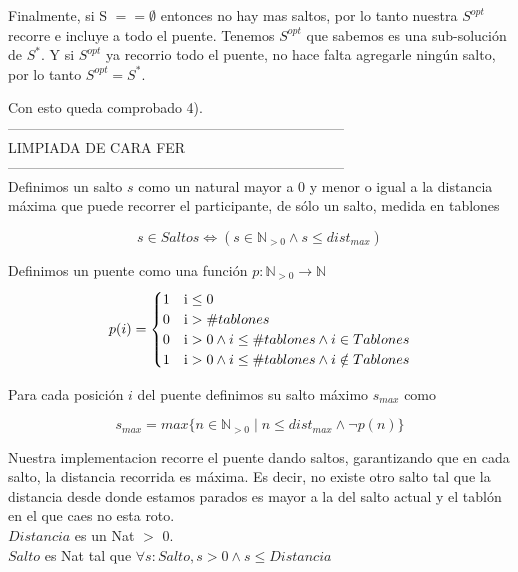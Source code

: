 Finalmente, si S $== \emptyset$ entonces no hay mas saltos, por lo tanto nuestra $S^{opt}$ recorre e incluye a todo el puente.
Tenemos $S^{opt}$  que sabemos es una sub-soluci\'on de $S^{*}$. Y si $S^{opt}$ ya recorrio todo el puente, no hace falta agregarle ning\'un salto, por lo tanto $S^{opt} =S^{*}$.  

Con esto queda comprobado 4).
\\

------------------------------------------------------------------------\\
LIMPIADA DE CARA FER\\
------------------------------------------------------------------------\\
Definimos un salto $s$ como un natural mayor a 0 y menor o igual a la distancia 
máxima que puede recorrer el participante, de sólo un salto, medida en tablones

\begin{displaymath}
	s \in Saltos \Leftrightarrow (s \in \mathbb{N}_{> 0} \land s \leq dist_{max})
\end{displaymath}

Definimos un puente como una función $p: \mathbb{N}_{>0} \to \mathbb{N}$ 
\begin{displaymath}
	p(i) = \begin{cases} 
					1 &\mbox i \leq 0 \\ 
					0 &\mbox i > \#tablones \\
					0 &\mbox i > 0 \land i \leq \#tablones \land i \in Tablones \\
					1 &\mbox i > 0 \land i \leq \#tablones \land i \notin Tablones \\
				\end{cases} %
\end{displaymath}

Para cada posición $i$ del puente definimos su salto máximo $s_{max}$ como 

\begin{displaymath}
	s_{max} = max \{n \in \mathbb{N}_{>0} \mid n \leq dist_{max} \land  \neg p(n)\}
\end{displaymath}

Nuestra implementacion recorre el puente dando saltos, garantizando que en cada salto, la distancia recorrida es m\'axima. Es decir, no existe otro salto tal que la distancia desde donde estamos parados es mayor a la del salto actual y el tabl\'on en el que caes no esta roto.\\
$Distancia$ es un Nat $>$ 0. \\
$Salto$ es Nat tal que $\forall s:Salto, s > 0 \wedge s \leq Distancia$
 
